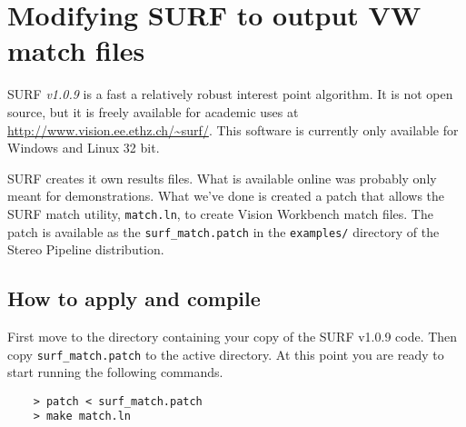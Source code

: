 \chapter{Modifying SURF to output VW match files}
\label{appendix_surf}

SURF \emph{v1.0.9} is a fast a relatively robust interest point
algorithm. It is not open source, but it is freely available for
academic uses at \url{http://www.vision.ee.ethz.ch/~surf/}. This
software is currently only available for Windows and Linux 32 bit.

SURF creates it own results files. What is available online was
probably only meant for demonstrations. What we've done is created a
patch that allows the SURF match utility, \texttt{match.ln}, to create
Vision Workbench match files. The patch is available as the 
\texttt{surf\_match.patch} in the \texttt{examples/} directory of the
Stereo Pipeline distribution.

\section{How to apply and compile}

First move to the directory containing your copy of the SURF v1.0.9
code. Then copy \texttt{surf\_match.patch} to the active directory. At
this point you are ready to start running the following commands.

\begin{verbatim}
    > patch < surf_match.patch
    > make match.ln
\end{verbatim}

\begin{center}
\end{center}

